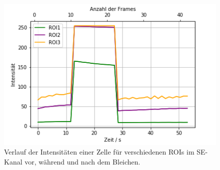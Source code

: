 \begin{figure}[h]
    \centering
    \includegraphics[scale = 0.45]{Bilder/bleachPlotS.png}
    \caption{Verlauf der Intensitäten einer Zelle für verschiedenen ROIs im SE-Kanal vor, während und nach dem Bleichen.}
    \label{bild:bleachPlotS}
\end{figure}